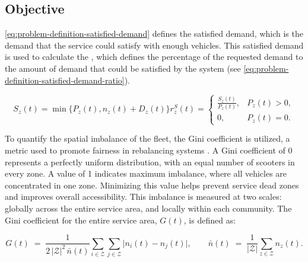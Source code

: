 \subsection{Objective}\label{sec:design-problem_definition-objective}

\autoref{eq:problem-definition-satisfied-demand} defines the satisfied demand, which is the demand that the service could satisfy with enough vehicles.
This satisfied demand is used to calculate the , which defines the percentage of the requested demand to the amount of demand that could be satisfied by the system (see \autoref{eq:problem-definition-satisfied-demand-ratio}).

\begin{subequations}
    \begin{equation}\label{eq:problem-definition-satisfied-demand}
        S_z(t) = \min\{P_z(t), n_z(t) + D_z(t)\}
    \end{equation}
    \begin{equation}\label{eq:problem-definition-satisfied-demand-ratio}
        r^S_z(t) = 
        \begin{cases}
            \frac{S_z(t)}{P_z(t)}, & P_z(t) > 0,\\[8pt]
            0, & P_z(t) = 0.
        \end{cases}
    \end{equation}
\end{subequations}

To quantify the spatial imbalance of the fleet, the Gini coefficient is utilized, a metric used to promote fairness in rebalancing systems \cite{cederle_fairness-oriented_2025}.
A Gini coefficient of 0 represents a perfectly uniform distribution, with an equal number of scooters in every zone.
A value of 1 indicates maximum imbalance, where all vehicles are concentrated in one zone.
Minimizing this value helps prevent service dead zones and improves overall accessibility.
This imbalance is measured at two scales: globally across the entire service area, and locally within each community.
The Gini coefficient for the entire service area, $G(t)$, is defined as:

\begin{equation}\label{eq:pb-objective-gini}
G(t) \;=\; 
\frac{1}{2 \, |\mathcal{Z}|^2 \, \bar{n}(t)} 
\sum_{i \in \mathcal{Z}} \sum_{j \in \mathcal{Z}} 
\bigl\lvert n_i(t) - n_j(t)\bigr\rvert,
\qquad
\bar{n}(t) \;=\; \frac{1}{|\mathcal{Z}|} \sum_{z \in \mathcal{Z}} n_z(t).
\end{equation}

